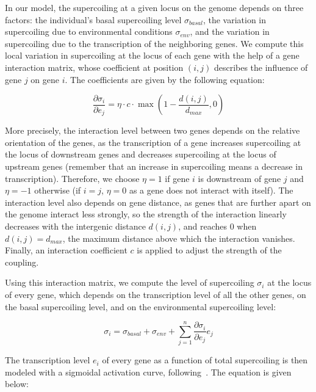 In our model, the supercoiling at a given locus on the genome depends on three factors: the individual's basal supercoiling level $\sigma_{basal}$, the variation in supercoiling due to environmental conditions $\sigma_{env}$, and the variation in supercoiling due to the transcription of the neighboring genes.
We compute this local variation in supercoiling at the locus of each gene with the help of a gene interaction matrix, whose coefficient at position $(i, j)$ describes the influence of gene $j$ on gene $i$.
The coefficients are given by the following equation:

\begin{equation}
\frac{\partial\sigma_{i}}{\partial e_j} = \eta\cdot c \cdot\max(1-\frac{d(i, j)}{d_{max}}, 0)
\label{eq:dsde}
\end{equation}

More precisely, the interaction level between two genes depends on the relative orientation of the genes, as the transcription of a gene increases supercoiling at the locus of downstream genes and decreases supercoiling at the locus of upstream genes (remember that an increase in supercoiling means a decrease in transcription).
Therefore, we choose $\eta = 1$ if gene $i$ is downstream of gene $j$ and $\eta = -1$ otherwise (if $i=j$, $\eta = 0$ as a gene does not interact with itself).
The interaction level also depends on gene distance, as genes that are further apart on the genome interact less strongly, so the strength of the interaction linearly decreases with the intergenic distance $d(i, j)$, and reaches 0 when $d(i, j) = d_{max}$, the maximum distance above which the interaction vanishes.
Finally, an interaction coefficient $c$ is applied to adjust the strength of the coupling.

Using this interaction matrix, we compute the level of supercoiling $\sigma_i$ at the locus of every gene, which depends on the transcription level of all the other genes, on the basal supercoiling level, and on the environmental supercoiling level:

\begin{equation}
\sigma_i = \sigma_{basal} + \sigma_{env} + \sum_{j=1}^n\frac{\partial\sigma_{i}}{\partial e_j}e_j
\label{eq:alife_sigma}
\end{equation}

The transcription level $e_i$ of every gene as a function of total supercoiling is then modeled with a sigmoidal activation curve, following~\cite{elhoudaigui2019}.
The equation is given below:

